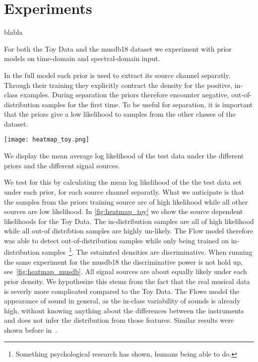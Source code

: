 \section{Experiments}%
\label{sec:experiments}

blabla

For both the Toy Data and the musdb18 dataset we experiment with prior models on time-domain and spectral-domain input.

In the full model each prior is used to extract its source channel separatly. Through their training they explicitly contract the density for the positive, in-class examples. During separation the priors therefore encounter negative, out-of-distribution samples for the first time. To be useful for separation, it is important that the priors give a low likelihood to samples from the other classes of the dataset.

\begin{marginfigure}
    \texttt{[image: heatmap\_toy.png]}%
    \caption{We display the mean average log likelihood of the test data under the different priors and the different signal sources.}%
    \label{fig:heatmap_toy}
\end{marginfigure}

We test for this by calculating the mean log likelihood of the the test data set under each prior, for each source channel separatly. What we anticipate is that the samples from the priors training source are of high likelihood while all other sources are low likelihood. In \cref{fig:heatmap_toy} we show the source dependent likelihoods for the Toy Data. The in-distribution samples are all of high likelihood while all out-of distribtion samples are highly un-likely. The Flow model therefore was able to detect out-of-distribution samples while only being trained on in-distribution samples~\footnote{Something psychological research has shown, humans being able to do.}. The estaimted densities are discriminative. When running the same experiment for the musdb18 the discriminative power is not hold up, see~\cref{fig:heatmap_musdb}. All signal sources are about equally likely under each prior density. We hypothesize this stems from the fact that the real musical data is severly more complicated compared to the Toy Data. The Flows model the appearance of sound in general, as the in-class variability of sounds is already high, without knowing anything about the  differences between the instruments and does not infer the distribution from those features. Similar results were shown before in~.


